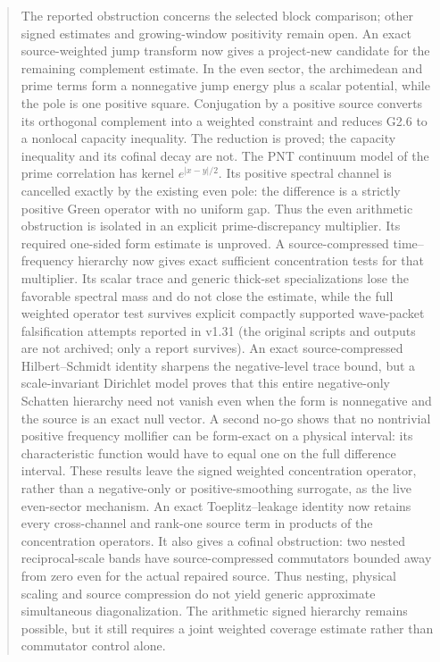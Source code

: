 \documentclass[11pt]{article}
\theoremstyle{remark}
\begin{document}
\begin{abstract}
The reported obstruction concerns the selected block comparison;
other signed estimates and growing-window positivity remain open.
An exact source-weighted jump transform now gives a project-new
candidate for the remaining complement estimate.  In the even sector,
the archimedean and prime terms form a nonnegative jump energy plus a
scalar potential, while the pole is one positive square.  Conjugation
by a positive source converts its orthogonal complement into a
weighted constraint and reduces G2.6 to a nonlocal
capacity inequality.  The reduction is proved; the capacity inequality
and its cofinal decay are not.
The PNT continuum model of the prime correlation has kernel
$e^{|x-y|/2}$. Its positive spectral channel is cancelled exactly by
the existing even pole: the difference is a strictly positive Green
operator with no uniform gap. Thus the even arithmetic obstruction is
isolated in an explicit prime-discrepancy multiplier. Its required
one-sided form estimate is unproved. A source-compressed
time--frequency hierarchy now gives exact sufficient concentration
tests for that multiplier. Its scalar trace and generic thick-set
specializations lose the favorable spectral mass and do not close the
estimate, while the full weighted operator test survives explicit
compactly supported wave-packet falsification attempts reported in v1.31
(the original scripts and outputs are not archived; only a report survives).
An exact source-compressed Hilbert--Schmidt identity sharpens the
negative-level trace bound, but a scale-invariant Dirichlet model proves
that this entire negative-only Schatten hierarchy need not vanish even
when the form is nonnegative and the source is an exact null vector.
A second no-go shows that no nontrivial positive frequency mollifier can
be form-exact on a physical interval: its characteristic function would
have to equal one on the full difference interval.  These results leave
the signed weighted concentration operator, rather than a negative-only
or positive-smoothing surrogate, as the live even-sector mechanism.
An exact Toeplitz--leakage identity now retains every cross-channel and
rank-one source term in products of the concentration operators.  It
also gives a cofinal obstruction: two nested reciprocal-scale bands have
source-compressed commutators bounded away from zero even for the actual
repaired source.  Thus nesting, physical scaling and source compression
do not yield generic approximate simultaneous diagonalization.  The
arithmetic signed hierarchy remains possible, but it still requires a
joint weighted coverage estimate rather than commutator control alone.

\end{abstract}
\end{document}
